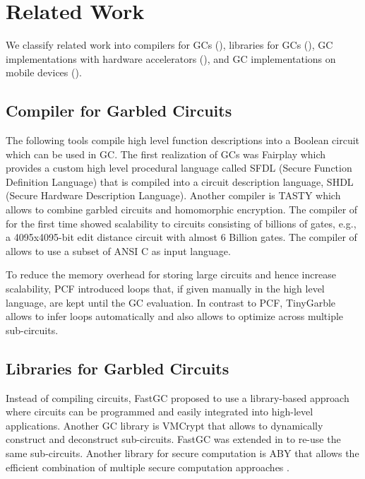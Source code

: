 \chapter{Related Work}
We classify related work into compilers for GCs (), libraries for GCs (), GC implementations with hardware accelerators (), and GC implementations on mobile devices ().

\section{Compiler for Garbled Circuits}
The following tools compile high level function descriptions into a Boolean circuit which can be used in GC.
The first realization of GCs was Fairplay \cite{malkhi2004fairplay} which provides a custom high level procedural language called SFDL (Secure Function Definition Language) that is compiled into a circuit description language, SHDL (Secure Hardware Description Language).
Another compiler is TASTY \cite{henecka2010tasty} which allows to combine garbled circuits and homomorphic encryption.
The compiler of \cite{kreuter2012billion} for the first time showed scalability to circuits consisting of billions of gates, e.g., a 4095x4095-bit edit distance circuit with almost 6 Billion gates.
The compiler of \cite{franz2014cbmc} allows to use a subset of ANSI C as input language.

To reduce the memory overhead for storing large circuits and hence increase scalability, PCF \cite{kreuter2013pcf} introduced loops that, if given manually in the high level language, are kept until the GC evaluation.
In contrast to PCF, TinyGarble allows to infer loops automatically and also allows to optimize across multiple sub-circuits.

\section{Libraries for Garbled Circuits}
Instead of compiling circuits, FastGC \cite{huang2011faster} proposed to use a library-based approach where circuits can be programmed and easily integrated into high-level applications.
Another GC library is VMCrypt \cite{malka2011vmcrypt} that allows to dynamically construct and deconstruct sub-circuits.
FastGC was extended in \cite{henecka2013faster} to re-use the same sub-circuits.
Another library for secure computation is ABY that allows the efficient combination of multiple secure computation approaches \cite{demmler2015aby}.

